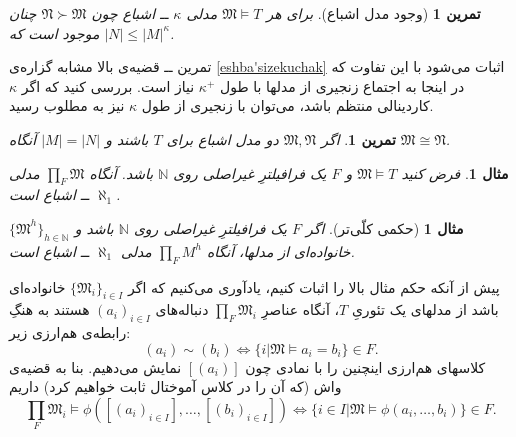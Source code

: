 \documentclass[12pt,a4paper]{article}
\theoremstyle{colorhead}
\newtheorem{tam}[thm]{تمرین}
\newtheorem{mesal}[thm]{مثال}
\begin{document}
\begin{tam}[وجود مدل اشباع]
برای هر
$\mathfrak{M}\models T$
مدلی 
$\kappa$
ــ
اشباع چون
$\mathfrak{N}\succ \mathfrak{M}$
چنان موجود است که 
$|N|\leq |M|^{\kappa}$.
\end{tam}
تمرین ــ‌ قضیه‌ی بالا مشابه گزاره‌ی
\ref{eshba'sizekuchak}
اثبات می‌شود با این تفاوت که
در اینجا به اجتماع زنجیری از مدلها با طول
$\kappa^+$
نیاز است. بررسی کنید که اگر
$\kappa$
کاردینالی منتظم
 باشد، می‌توان با زنجیری از طول
$\kappa$
نیز به مطلوب رسید.
\begin{tam}
اگر
$\mathfrak{M},\mathfrak{N}$
دو مدل اشباع برای 
$T$
باشند و 
$|M|=|N|$
آنگاه 
$\mathfrak{M}\cong \mathfrak{N}$.
\end{tam}
\begin{mesal}
فرض کنید 
$\mathfrak{M}\models T$
و
$F$
یک فرافیلترِ غیراصلی روی
$\mathbb{N}$
باشد. آنگاه
$\prod_F \mathfrak{M}$
مدلی 
$\aleph_1$
ــ
اشباع است. 
\end{mesal}
\begin{mesal}[حکمی کلّی‌تر]
اگر
$F$
یک فرافیلترِ غیراصلی روی
$\mathbb{N}$
باشد و
$\{\mathfrak{M}^h\}_{h\in \mathbb{N}}$
خانواده‌ای از مدلها،‌ آنگاه
$\prod_F M^h$
مدلی
$\aleph_1$
ــ‌
اشباع است.
\end{mesal}
پیش از آنکه حکم مثال بالا را اثبات کنیم، یادآوری می‌کنیم که اگر
$\{\mathfrak{M}_i\}_{i\in I}$
خانواده‌ای باشد از مدلهای یک تئوریِ
$T$، 
آنگاه عناصرِ
$\prod_F \mathfrak{M}_i$
دنباله‌های
$(a_i)_{i\in I}$
هستند به هنگِ رابطه‌ی هم‌ارزی زیر:
\[
(a_i)\sim (b_i)\Leftrightarrow \{i|\mathfrak{M}\models a_i=b_i\}\in F.
\]
کلاسهای هم‌ارزی اینچنین را با نمادی چون
$[(a_i)]$
نمایش می‌دهیم.  بنا به قضیه‌ی واش
 (که آن را در کلاس آموختال ثابت خواهیم کرد) داریم
 \[
 \prod_F \mathfrak{M}_i\models \phi([(a_i)_{i\in I}],\ldots,[(b_i)_{i\in I}])\Leftrightarrow \{i\in I|\mathfrak{M}\models \phi(a_i,\ldots,b_i)\}\in F.
 \]
\end{document}

